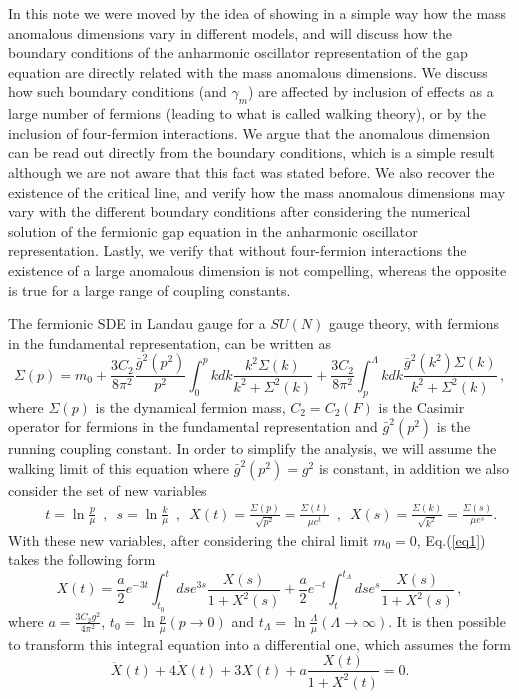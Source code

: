 \documentclass[preprint,amsmath,amssymb,superscriptaddress,showpacs,aps12pt]{revtex4}
\def\br{\begin{eqnarray}}
\def\er{\end{eqnarray}}
\def\be{\begin{equation}}
\def\ee{\end{equation}}
\begin{document}
\par In this note we were moved by the idea of showing in a simple way how the mass anomalous dimensions vary in different models, and
will discuss how the boundary conditions of the  anharmonic oscillator representation of the gap equation are directly related  with  the mass anomalous dimensions. We discuss how such boundary conditions (and $\gamma_m$) are  affected by inclusion of effects as a large number of fermions  (leading to what is called walking theory),  or by the inclusion of four-fermion interactions. We argue that
the anomalous dimension can be read out directly from the boundary conditions, which is a simple result although we are not
aware that this fact was stated before. We also recover the existence of the critical line, and verify how the mass anomalous
dimensions may vary with the different boundary conditions after considering the numerical solution of the fermionic  gap equation  
in the  anharmonic oscillator representation. Lastly, we verify that without four-fermion interactions the existence
of a large anomalous dimension is not compelling, whereas the opposite is true for a large range of coupling constants. 

\par The fermionic SDE in Landau gauge for a $SU(N)$ gauge theory, with fermions in the fundamental representation, can be written 
as \cite{Richard,georgi,us4}
\be
\Sigma(p)=m_0 + \frac{3C_2}{8\pi^2}\frac{\bar{g}^2(p^2)}{p^2} \int^{p}_{0}kdk \frac{k^2\Sigma(k)}{k^2+\Sigma^2(k)}
+ \frac{3C_2}{8\pi^2}\int^{\Lambda}_{p}kdk\frac{\bar{g}^2(k^2)\Sigma(k)}{k^2+\Sigma^2(k)} \, ,
\label{eq1} 
\ee 
\noindent  where $\Sigma(p)$ is the dynamical fermion mass,  $ C_2 =C_2 (F)$ is the Casimir operator for fermions in the fundamental representation and $\bar{g}^2(p^2)$ is the running coupling constant. In order to simplify the analysis, we will assume the walking limit of this equation where $\bar{g}^2(p^2) = g^2 $ is constant, in addition we also consider the set of new variables 
\br 
&&t=\ln\frac{p}{\mu} \,\,\,, \,\,\, s=\ln\frac{k}{\mu} \,\,\,,\,\,\,X(t) = \frac{\Sigma(p)}{\sqrt{p^2}} = \frac{\Sigma(t)}{\mu e^{t}}\,\,\,,\,\,\,X(s) = \frac{\Sigma(k)}{\sqrt{k^2}} = \frac{\Sigma(s)}{\mu e^{s}}.
\label{eq2}
\er 
\noindent  With these new variables, after considering the chiral limit $m_0 =0$,  Eq.(\ref{eq1}) takes the following form
\be
X(t)=  \frac{a}{2}e^{-3t}\int^{t}_{t_0}dse^{3s}\frac{X(s)}{1+X^2(s)}
+ \frac{a}{2}e^{-t}\int^{t_{\Lambda}}_{t}dse^{s}\frac{X(s)}{1+X^2(s)} \, ,
\label{eq3} 
\ee where $a=\frac{3C_2g^2}{4\pi^2}$, $t_0 = \ln\frac{p}{\mu}(p\to 0)$  and  $t_{\Lambda} = \ln\frac{\Lambda}{\mu}(\Lambda\to \infty)$. It is then possible to transform this integral equation into a differential one, which assumes the  form 
\be 
\ddot{X}(t) + 4\dot{X}(t) + 3X(t) + a\frac{X(t)}{1 + X^2(t)}=0.
\label{eq4} 
\ee 
\end{document}
